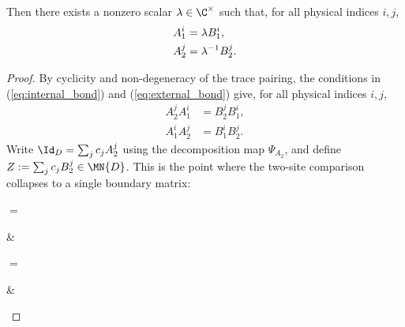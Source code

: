 \begin{lemma}
    Then there exists a nonzero scalar $\lambda\in\C^{\times}$ such
    that, for all physical indices $i,j$,
    \begin{align}
        A_1^i
         & =\lambda B_1^i,
        \notag                 \\
        A_2^j
         & =\lambda^{-1}B_2^j.
        \notag
    \end{align}
\end{lemma}

\begin{proof}
    \leanok
    By cyclicity and non-degeneracy of the trace pairing,
    the conditions in (\ref{eq:internal_bond})
    and (\ref{eq:external_bond}) give, for all physical indices $i,j$,
    \begin{align}
        A_2^jA_1^i
         & =B_2^jB_1^i,
        \label{eq:aft_product_identities_a} \\
        A_1^iA_2^j
         & =B_1^iB_2^j.
        \label{eq:aft_product_identities_b}
    \end{align}
    Write $\Id_D=\sum_jc_jA_2^j$ using the decomposition map
    $\Psi_{A_2}$, and define $Z:=\sum_jc_jB_2^j\in\MN{D}$.
    This is the point where the two-site comparison collapses to a single
    boundary matrix:
    \begin{center}
        \tenkzkernel
        \begin{tenkz}[cols=1, west=open, east=open]
        \end{tenkz}
        $ = $
        \begin{tenkz}[cols=2, west=open, east=open]
             & 
        \end{tenkz}
        $ = $
        \begin{tenkz}[cols=2, west=open, east=open]
             & 
        \end{tenkz}



\end{center}
\end{proof}
